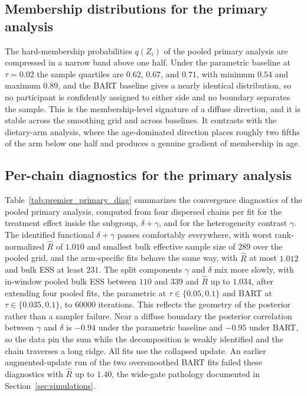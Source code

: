 \documentclass[11pt]{article}
\theoremstyle{definition}
\theoremstyle{plain}
\begin{document}
\subsection{Membership distributions for the primary analysis}
The hard-membership probabilities $q(Z_i)$ of the pooled primary analysis are compressed in a narrow band above one half. Under the parametric baseline at $\tau=0.02$ the sample quartiles are $0.62$, $0.67$, and $0.71$, with minimum $0.54$ and maximum $0.89$, and the BART baseline gives a nearly identical distribution, so no participant is confidently assigned to either side and no boundary separates the sample. This is the membership-level signature of a diffuse direction, and it is stable across the smoothing grid and across baselines. It contrasts with the dietary-arm analysis, where the age-dominated direction places roughly two fifths of the arm below one half and produces a genuine gradient of membership in age.

\subsection{Per-chain diagnostics for the primary analysis}
Table~\ref{tab:premier_primary_diag} summarizes the convergence diagnostics of the pooled primary analysis, computed from four dispersed chains per fit for the treatment effect inside the subgroup, $\delta+\gamma$, and for the heterogeneity contrast $\gamma$. The identified functional $\delta+\gamma$ passes comfortably everywhere, with worst rank-normalized $\widehat R$ of $1.010$ and smallest bulk effective sample size of $289$ over the pooled grid, and the arm-specific fits behave the same way, with $\widehat R$ at most $1.012$ and bulk ESS at least $231$. The split components $\gamma$ and $\delta$ mix more slowly, with in-window pooled bulk ESS between $110$ and $339$ and $\widehat R$ up to $1.034$, after extending four pooled fits, the parametric at $\tau\in\{0.05,0.1\}$ and BART at $\tau\in\{0.035,0.1\}$, to $60000$ iterations. This reflects the geometry of the posterior rather than a sampler failure. Near a diffuse boundary the posterior correlation between $\gamma$ and $\delta$ is $-0.94$ under the parametric baseline and $-0.95$ under BART, so the data pin the sum while the decomposition is weakly identified and the chain traverses a long ridge. All fits use the collapsed update. An earlier augmented-update run of the two oversmoothed BART fits failed these diagnostics with $\widehat R$ up to $1.40$, the wide-gate pathology documented in Section~\ref{sec:simulations}.
\end{document}
